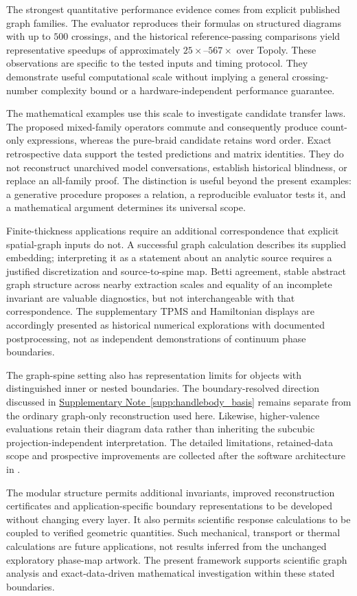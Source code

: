 \documentclass[10pt,twocolumn]{article}
\providecommand{\SuppSubsecref}[1]{\hyperref[#1]{Supplementary Note~\ref*{#1}}}
\begin{document}
The strongest quantitative performance evidence comes from explicit published graph families. The evaluator reproduces their formulas on structured diagrams with up to $500$ crossings, and the historical reference-passing comparisons yield representative speedups of approximately $25\times$--$567\times$ over Topoly. These observations are specific to the tested inputs and timing protocol. They demonstrate useful computational scale without implying a general crossing-number complexity bound or a hardware-independent performance guarantee.

The mathematical examples use this scale to investigate candidate transfer laws. The proposed mixed-family operators commute and consequently produce count-only expressions, whereas the pure-braid candidate retains word order. Exact retrospective data support the tested predictions and matrix identities. They do not reconstruct unarchived model conversations, establish historical blindness, or replace an all-family proof. The distinction is useful beyond the present examples: a generative procedure proposes a relation, a reproducible evaluator tests it, and a mathematical argument determines its universal scope.

Finite-thickness applications require an additional correspondence that explicit spatial-graph inputs do not. A successful graph calculation describes its supplied embedding; interpreting it as a statement about an analytic source requires a justified discretization and source-to-spine map. Betti agreement, stable abstract graph structure across nearby extraction scales and equality of an incomplete invariant are valuable diagnostics, but not interchangeable with that correspondence. The supplementary TPMS and Hamiltonian displays are accordingly presented as historical numerical explorations with documented postprocessing, not as independent demonstrations of continuum phase boundaries.

The graph-spine setting also has representation limits for objects with distinguished inner or nested boundaries. The boundary-resolved direction discussed in \SuppSubsecref{supp:handlebody_basis} remains separate from the ordinary graph-only reconstruction used here. Likewise, higher-valence evaluations retain their diagram data rather than inheriting the subcubic projection-independent interpretation. The detailed limitations, retained-data scope and prospective improvements are collected after the software architecture in .

The modular structure permits additional invariants, improved reconstruction certificates and application-specific boundary representations to be developed without changing every layer. It also permits scientific response calculations to be coupled to verified geometric quantities. Such mechanical, transport or thermal calculations are future applications, not results inferred from the unchanged exploratory phase-map artwork. The present framework supports scientific graph analysis and exact-data-driven mathematical investigation within these stated boundaries.
\end{document}
